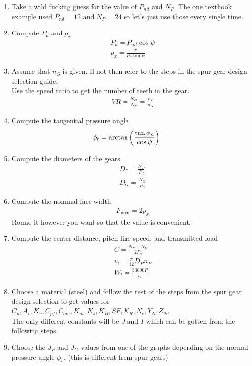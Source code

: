 \documentclass[11pt, fleqn]{article}
\begin{document}
\begin{enumerate}
    \item Take a wild fucking guess for the value of $P_{nd}$ and $N_P$. The one textbook example used $P_{nd}=12$ and $N_P=24$ so let's just use those every single time.
    \item Compute $P_d$ and $p_x$
    \begin{align*}
        &P_d=P_{nd}\cos\psi\\
        &p_x=\frac{\pi}{P_d\tan\psi}
    \end{align*}
    \item Assume that $n_G$ is given. If not then refer to the steps in the spur gear design selection guide.\\
    Use the speed ratio to get the number of teeth in the gear.
    \begin{align*}
        &VR=\frac{N_G}{N_P}=\frac{n_P}{n_G}
    \end{align*}
    \item Compute the tangential pressure angle
    \begin{align*}
        &\phi_t=\arctan\left( \frac{\tan\phi_n}{\cos\psi} \right)
    \end{align*}
    \item Compute the diameters of the gears
    \begin{align*}
        &D_P=\frac{N_P}{P_d}\\
        &D_G=\frac{N_G}{P_d}
    \end{align*}
    \item Compute the nominal face width
    \begin{align*}
        &F_\text{nom}=2p_x
    \end{align*}
    Round it however you want so that the value is convenient.
    \item Compute the center distance, pitch line speed, and transmitted load
    \begin{align*}
        &C=\frac{N_P+N_G}{2P_d}\\
        &v_t=\frac{\pi}{12}D_Pn_P\\
        &W_t=\frac{33000P}{v_t}
    \end{align*}
    \item Choose a material (steel) and follow the rest of the steps from the spur gear design selection to get values for $C_p,A_v,K_v,C_{pf},C_{ma},K_m,K_s,K_B,SF,K_R,N_{c},Y_N,Z_N$.\\
    The only different constants will be $J$ and $I$ which can be gotten from the following steps.
    \item Choose the $J_P$ and $J_G$ values from one of the graphs depending on the normal pressure angle $\phi_n$. (this is different from spur gears)\\

\end{enumerate}
\end{document}
